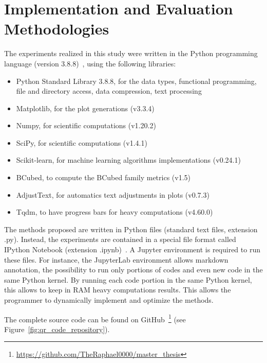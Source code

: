 \section{Implementation and Evaluation Methodologies}

The experiments realized in this study were written in the Python programming language (version 3.8.8)~\cite{python}, using the following libraries:

\begin{itemize}
  \item Python Standard Library 3.8.8, for the data types, functional programming, file and directory access, data compression, text processing~\cite{python_standard_library}
  \item Matplotlib, for the plot generations (v3.3.4)~\cite{matplotlib}
  \item Numpy, for scientific computations (v1.20.2)~\cite{numpy}
  \item SciPy, for scientific computations (v1.4.1)~\cite{scipy}
  \item Scikit-learn, for machine learning algorithms implementations (v0.24.1)~\cite{sklearn}
  \item BCubed, to compute the BCubed family metrics (v1.5)~\cite{bcubed_gh}
  \item AdjustText, for automatics text adjustments in plots (v0.7.3)~\cite{adjustText}
  \item Tqdm, to have progress bars for heavy computations (v4.60.0)~\cite{tqdm}
\end{itemize}

The methods proposed are written in Python files (standard text files, extension .py).
Instead, the experiments are contained in a special file format called IPython Notebook (extension .ipynb)~\cite{jupyter}.
A Jupyter environment is required to run these files.
For instance, the JupyterLab environment allows markdown annotation, the possibility to run only portions of codes and even new code in the same Python kernel.
By running each code portion in the same Python kernel, this allows to keep in RAM heavy computations results.
This allows the programmer to dynamically implement and optimize the methods.

The complete source code can be found on GitHub~\footnote{\url{https://github.com/TheRaphael0000/master_thesis}} (see Figure~\ref{fig:qr_code_repository}).

